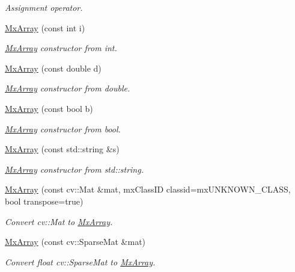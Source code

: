 \begin{DoxyCompactItemize}
\begin{DoxyCompactList}\small\item\em \-Assignment operator. \end{DoxyCompactList}\item 
\hyperlink{class_mx_array_a0ec931f3bd676bf735fb0c233d6ed451}{\-Mx\-Array} (const int i)
\begin{DoxyCompactList}\small\item\em \hyperlink{class_mx_array}{\-Mx\-Array} constructor from int. \end{DoxyCompactList}\item 
\hyperlink{class_mx_array_a1b3623615402c6e949b03d30e35dea73}{\-Mx\-Array} (const double d)
\begin{DoxyCompactList}\small\item\em \hyperlink{class_mx_array}{\-Mx\-Array} constructor from double. \end{DoxyCompactList}\item 
\hyperlink{class_mx_array_a5617fd8f0d2b6b1cea2ede44ab306b98}{\-Mx\-Array} (const bool b)
\begin{DoxyCompactList}\small\item\em \hyperlink{class_mx_array}{\-Mx\-Array} constructor from bool. \end{DoxyCompactList}\item 
\hyperlink{class_mx_array_a805f2eb5b095527b50831388e5ba1dc6}{\-Mx\-Array} (const std\-::string \&s)
\begin{DoxyCompactList}\small\item\em \hyperlink{class_mx_array}{\-Mx\-Array} constructor from std\-::string. \end{DoxyCompactList}\item 
\hyperlink{class_mx_array_ab4306c5e0791fd624b6038fd8fac3e58}{\-Mx\-Array} (const cv\-::\-Mat \&mat, mx\-Class\-I\-D classid=mx\-U\-N\-K\-N\-O\-W\-N\-\_\-\-C\-L\-A\-S\-S, bool transpose=true)
\begin{DoxyCompactList}\small\item\em \-Convert cv\-::\-Mat to \hyperlink{class_mx_array}{\-Mx\-Array}. \end{DoxyCompactList}\item 
\hyperlink{class_mx_array_a4f4dcca25beb643cf8e78a477513a522}{\-Mx\-Array} (const cv\-::\-Sparse\-Mat \&mat)
\begin{DoxyCompactList}\small\item\em \-Convert float cv\-::\-Sparse\-Mat to \hyperlink{class_mx_array}{\-Mx\-Array}. \end{DoxyCompactList}\item 

\end{DoxyCompactItemize}
